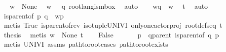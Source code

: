 \begin{isabellebody}
\ \isamarkupfalse%
\ {\isachardoublequoteopen}w\ {\isasymin}\ {\isasymT}\isactrlbsub None\isactrlesub {\isachardoublequoteclose}\ \isamarkupfalse%
\ {\isacartoucheopen}w\ {\isasymin}\ {\isasymL}\ q{\isacartoucheclose}\ root{\isacharunderscore}{\kern0pt}lang{\isacharunderscore}{\kern0pt}is{\isacharunderscore}{\kern0pt}mbox\ \isamarkupfalse%
\ auto\isanewline
\ \ \isamarkupfalse%
\ {\isachardoublequoteopen}w{\isasymdown}\isactrlsub q\ {\isacharequal}{\kern0pt}\ w{\isachardoublequoteclose}\ \isamarkupfalse%
\ t{}\ \isamarkupfalse%
\ auto\isanewline
\ \ \isamarkupfalse%
\ \isamarkupfalse%
\ {\isachardoublequoteopen}{\isacharparenleft}{\kern0pt}is{\isacharunderscore}{\kern0pt}parent{\isacharunderscore}{\kern0pt}of\ p\ q\ {\isasymlongrightarrow}\ w{\isasymdown}\isactrlsub p\ {\isacharequal}{\kern0pt}\ {\isasymepsilon}{\isacharparenright}{\kern0pt}{\isachardoublequoteclose}\ \isamarkupfalse%
\ {\isacharparenleft}{\kern0pt}metis\ True\ is{\isacharunderscore}{\kern0pt}parent{\isacharunderscore}{\kern0pt}of{\isacharunderscore}{\kern0pt}rev{\isacharparenleft}{\kern0pt}{}{\isacharparenright}{\kern0pt}\ iso{\isacharunderscore}{\kern0pt}tuple{\isacharunderscore}{\kern0pt}UNIV{\isacharunderscore}{\kern0pt}I\ only{\isacharunderscore}{\kern0pt}one{\isacharunderscore}{\kern0pt}actor{\isacharunderscore}{\kern0pt}proj\ root{\isacharunderscore}{\kern0pt}defs{\isacharunderscore}{\kern0pt}eq\ t{}{\isacharparenright}{\kern0pt}\isanewline
\ \ \isamarkupfalse%
\ \isamarkupfalse%
\ {\isacharquery}{\kern0pt}thesis\ \isamarkupfalse%
\ {\isacharparenleft}{\kern0pt}metis\ {\isacartoucheopen}w\ {\isasymin}\ {\isasymT}\isactrlbsub None\isactrlesub {\isacartoucheclose}\ t{}{\isacharparenright}{\kern0pt}\isanewline
{}\isamarkupfalse%
\isanewline
\ \ \isamarkupfalse%
\ False\ \isanewline
\ \ \isamarkupfalse%
\ \isamarkupfalse%
\ p\ \ q{\isacharunderscore}{\kern0pt}parent{\isacharcolon}{\kern0pt}\ {\isachardoublequoteopen}is{\isacharunderscore}{\kern0pt}parent{\isacharunderscore}{\kern0pt}of\ q\ p{\isachardoublequoteclose}\ \isamarkupfalse%
\ {\isacharparenleft}{\kern0pt}metis\ UNIV{\isacharunderscore}{\kern0pt}I\ assms{\isacharparenleft}{\kern0pt}{}{\isacharparenright}{\kern0pt}\ path{\isacharunderscore}{\kern0pt}to{\isacharunderscore}{\kern0pt}root{\isachardot}{\kern0pt}cases\ path{\isacharunderscore}{\kern0pt}to{\isacharunderscore}{\kern0pt}root{\isacharunderscore}{\kern0pt}exists{\isacharparenright}{\kern0pt}\isanewline

\end{isabellebody}
